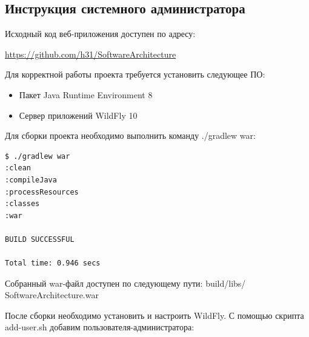 \subsection{Инструкция системного администратора}

Исходный код веб-приложения доступен по адресу:

\url{https://github.com/h31/SoftwareArchitecture}

Для корректной работы проекта требуется установить следующее ПО:

\begin{itemize}
\item Пакет Java Runtime Environment 8
\item Сервер приложений WildFly 10
\end{itemize}

Для сборки проекта необходимо выполнить команду ./gradlew war:

\begin{lstlisting}
$ ./gradlew war
:clean
:compileJava
:processResources
:classes
:war

BUILD SUCCESSFUL

Total time: 0.946 secs
\end{lstlisting}

Собранный war-файл доступен по следующему пути: build/libs/\\SoftwareArchitecture.war

После сборки необходимо установить и настроить WildFly. С помощью скрипта add-user.sh добавим пользователя-администратора:

